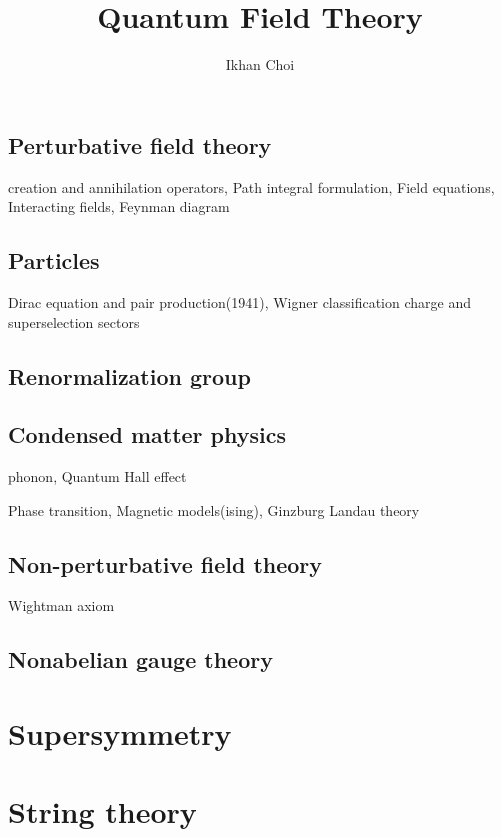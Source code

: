 \documentclass{../../large}
\begin{document}
\title{Quantum Field Theory}
\author{Ikhan Choi}
\maketitle
\tableofcontents


\part{}

\chapter{Perturbative field theory}
creation and annihilation operators,
Path integral formulation,
Field equations,
Interacting fields,
Feynman diagram


\chapter{Particles}
Dirac equation and pair production(1941),
Wigner classification
charge and superselection sectors

\chapter{Renormalization group}


\chapter{Condensed matter physics}
phonon,
Quantum Hall effect

Phase transition,
Magnetic models(ising),
Ginzburg Landau theory


\chapter{Non-perturbative field theory}
Wightman axiom


\chapter{Nonabelian gauge theory}





\part{Supersymmetry}
\part{String theory}
\end{document}
